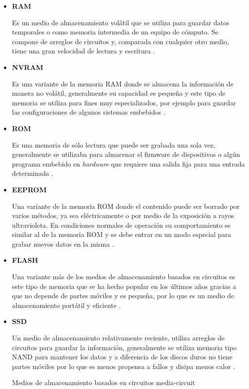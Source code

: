 \begin{itemize}

  \item \textbf{RAM}

Es un medio de almacenamiento vol\'{a}til que se utiliza para guardar datos temporales o como memoria intermedia de un equipo de c\'{o}mputo. Se compone de arreglos de circuitos y, comparada con cualquier otro medio, tiene una gran velocidad de lectura y escritura \cite{_rom_????}.

  \item \textbf{NVRAM}

Es una variante de la memoria \textsc{RAM} donde se almacena la informaci\'{o}n de manera no vol\'{a}til, generalmente su capacidad es peque\~{n}a y este tipo de memoria se utiliza para fines muy especializados, por ejemplo para guardar las configuraciones de algunos sistemas embebidos \cite{veenstra_random_1986}.

  \item \textbf{ROM}

Es una memoria de s\'{o}lo lectura que puede ser grabada una sola vez, generalmente se utilizaba para almacenar el firmware de dispositivos o alg\'{u}n programa embebido en \textit{hardware} que requiere una salida fija para una entrada determinada \cite{_rom_????}.

  \item \textbf{EEPROM}

Una variante de la memoria \textsc{ROM} donde el contenido puede ser borrado por varios m\'{e}todos, ya sea el\'{e}ctricamente o por medio de la exposici\'{o}n a rayos ultravioleta. En condiciones normales de operaci\'{o}n su comportamiento es similar al de la memoria \textsc{ROM} y se debe entrar en un modo especial para grabar nuevos datos en la misma \cite{_rom_????-1}.

  \item \textbf{FLASH}

Una variante m\'{a}s de los medios de almacenamiento basados en circuitos es este tipo de memoria que se ha hecho popular en los \'{u}ltimos a\~{n}os gracias a que no depende de partes m\'{o}viles y es peque\~{n}a, por lo que es un medio de almacenamiento port\'{a}til y eficiente \cite{_flashmemguide.pdf_????}.

  \item \textbf{SSD}

Un medio de almacenamiento relativamente reciente, utiliza arreglos de circuitos para guardar la informaci\'{o}n, generalmente se utiliza memoria tipo \textsc{NAND} para mantener los datos y a diferencia de los discos duros no tiene partes m\'{o}viles por lo que es menos propensa a fallos y disipa menos calor \cite{_ssd-faq-us.pdf_????}.

\diagramblock
{Medios de almacenamiento basados en circuitos}
{media-circuit}
{
 {
  
 }
}

\end{itemize}

